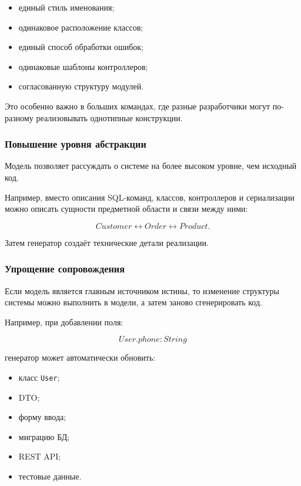 \documentclass[12pt,a4paper]{article}
\begin{document}
\begin{itemize}
    \item единый стиль именования;
    \item одинаковое расположение классов;
    \item единый способ обработки ошибок;
    \item одинаковые шаблоны контроллеров;
    \item согласованную структуру модулей.
\end{itemize}

Это особенно важно в больших командах, где разные разработчики могут по-разному реализовывать однотипные конструкции.

\subsubsection{Повышение уровня абстракции}

Модель позволяет рассуждать о системе на более высоком уровне, чем исходный код.

Например, вместо описания SQL-команд, классов, контроллеров и сериализации можно описать сущности предметной области и связи между ними:

\[
    Customer \longleftrightarrow Order \longleftrightarrow Product.
\]

Затем генератор создаёт технические детали реализации.

\subsubsection{Упрощение сопровождения}

Если модель является главным источником истины, то изменение структуры системы можно выполнить в модели, а затем заново сгенерировать код.

Например, при добавлении поля:

\[
    User.phone: String
\]

генератор может автоматически обновить:

\begin{itemize}
    \item класс \texttt{User};
    \item DTO;
    \item форму ввода;
    \item миграцию БД;
    \item REST API;
    \item тестовые данные.
\end{itemize}
\end{document}
